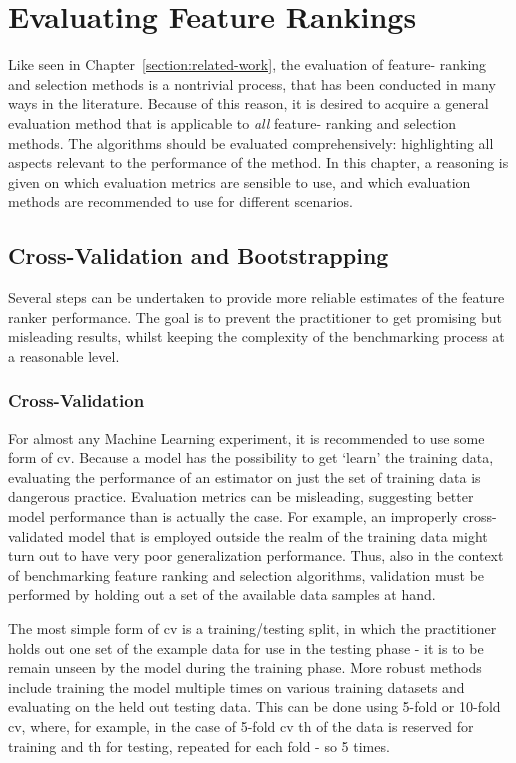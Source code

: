 \documentclass[../main.tex]{subfiles}
\begin{document}
\section{Evaluating Feature Rankings}\label{section:evaluation}
Like seen in Chapter~\ref{section:related-work}, the evaluation of feature- ranking and selection methods is a nontrivial process, that has been conducted in many ways in the literature. Because of this reason, it is desired to acquire a general evaluation method that is applicable to \textit{all} feature- ranking and selection methods. The algorithms should be evaluated comprehensively: highlighting all aspects relevant to the performance of the method. In this chapter, a reasoning is given on which evaluation metrics are sensible to use, and which evaluation methods are recommended to use for different scenarios.



\subsection{Cross-Validation and Bootstrapping}\label{section:cv}
Several steps can be undertaken to provide more reliable estimates of the feature ranker performance. The goal is to prevent the practitioner to get promising but misleading results, whilst keeping the complexity of the benchmarking process at a reasonable level.



\subsubsection{Cross-Validation}
For almost any Machine Learning experiment, it is recommended to use some form of \gls{cv}. Because a model has the possibility to get `learn' the training data, evaluating the performance of an estimator on just the set of training data is dangerous practice. Evaluation metrics can be misleading, suggesting better model performance than is actually the case. For example, an improperly cross-validated model that is employed outside the realm of the training data might turn out to have very poor generalization performance. Thus, also in the context of benchmarking feature ranking and selection algorithms, validation must be performed by holding out a set of the available data samples at hand.

The most simple form of \gls{cv} is a training/testing split, in which the practitioner holds out one set of the example data for use in the testing phase - it is to be remain unseen by the model during the training phase. More robust methods include training the model multiple times on various training datasets and evaluating on the held out testing data. This can be done using 5-fold or 10-fold \gls{cv}, where, for example, in the case of 5-fold \gls{cv} th of the data is reserved for training and th for testing, repeated for each fold - so 5 times.
\end{document}
